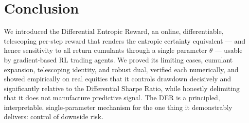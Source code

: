 \documentclass[11pt]{article}
\theoremstyle{definition}
\begin{document}
\section{Conclusion}\label{sec:conclusion}

We introduced the Differential Entropic Reward, an online, differentiable, telescoping
per-step reward that renders the entropic certainty equivalent --- and hence
sensitivity to all return cumulants through a single parameter $\theta$ --- usable by
gradient-based RL trading agents. We proved its limiting cases, cumulant expansion,
telescoping identity, and robust dual, verified each numerically, and showed
empirically on real equities that it controls drawdown decisively and significantly
relative to the Differential Sharpe Ratio, while honestly delimiting that it does not
manufacture predictive signal. The DER is a principled, interpretable,
single-parameter mechanism for the one thing it demonstrably delivers: control of
downside risk.
\end{document}

